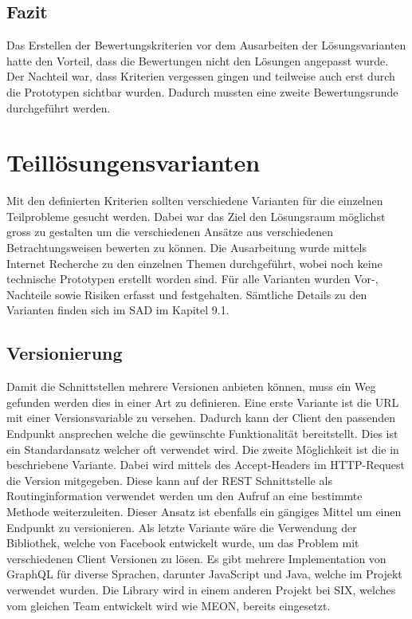 \subsection{Fazit}

Das Erstellen der Bewertungskriterien vor dem Ausarbeiten der Lösungsvarianten hatte den Vorteil, dass die Bewertungen nicht den Lösungen angepasst wurde. Der Nachteil war, dass Kriterien vergessen gingen und teilweise auch erst durch die Prototypen sichtbar wurden. Dadurch mussten eine zweite Bewertungsrunde durchgeführt werden.


\section{Teillösungensvarianten}

Mit den definierten Kriterien sollten verschiedene Varianten für die einzelnen Teilprobleme gesucht werden. Dabei war das Ziel den Lösungsraum möglichst gross zu gestalten um die verschiedenen Ansätze aus verschiedenen Betrachtungsweisen bewerten zu können. Die Ausarbeitung wurde mittels Internet Recherche zu den einzelnen Themen durchgeführt, wobei noch keine technische Prototypen erstellt worden sind. Für alle Varianten wurden Vor-, Nachteile sowie Risiken erfasst und festgehalten. Sämtliche Details zu den Varianten finden sich im SAD im Kapitel 9.1.

\subsection{Versionierung}

Damit die Schnittstellen mehrere Versionen anbieten können, muss ein Weg gefunden werden dies in einer Art zu definieren. \newline Eine erste Variante ist die URL mit einer Versionsvariable zu versehen. Dadurch kann der Client den passenden Endpunkt ansprechen welche die gewünschte Funktionalität bereitstellt. Dies ist ein Standardansatz welcher oft verwendet wird. Die zweite Möglichkeit ist die in \cite{contneg} beschriebene Variante. Dabei wird mittels des Accept-Headers im HTTP-Request die Version mitgegeben. Diese kann auf der REST Schnittstelle als Routinginformation verwendet werden um den Aufruf an eine bestimmte Methode weiterzuleiten. Dieser Ansatz ist ebenfalls ein gängiges Mittel um einen Endpunkt zu versionieren. Als letzte Variante wäre die Verwendung der \cite{gq} Bibliothek, welche von Facebook entwickelt wurde, um das Problem mit verschiedenen Client Versionen zu lösen. Es gibt mehrere Implementation von GraphQL für diverse Sprachen, darunter JavaScript und Java, welche im Projekt verwendet wurden. Die Library wird in einem anderen Projekt bei SIX, welches vom gleichen Team entwickelt wird wie MEON, bereits eingesetzt.

